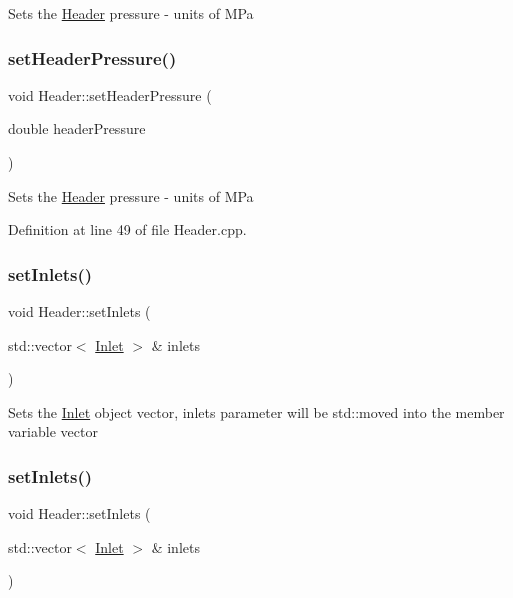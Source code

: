 Sets the \hyperlink{class_header}{Header} pressure -\/ units of M\+Pa \mbox{\label{class_header_a3af0b7964b74287ce0c662b9a88556ed}} 
\subsubsection{\texorpdfstring{set\+Header\+Pressure()}{setHeaderPressure()}\hspace{0.1cm}{\footnotesize\ttfamily [3/3]}}
{\footnotesize\ttfamily void Header\+::set\+Header\+Pressure (\begin{DoxyParamCaption}\item[{double}]{header\+Pressure }\end{DoxyParamCaption})}

Sets the \hyperlink{class_header}{Header} pressure -\/ units of M\+Pa 

Definition at line 49 of file Header.\+cpp.

\mbox{\label{class_header_ae69b6f894210a6cd340e92222f8bc343}} 
\subsubsection{\texorpdfstring{set\+Inlets()}{setInlets()}\hspace{0.1cm}{\footnotesize\ttfamily [1/3]}}
{\footnotesize\ttfamily void Header\+::set\+Inlets (\begin{DoxyParamCaption}\item[{std\+::vector$<$ \hyperlink{class_inlet}{Inlet} $>$ \&}]{inlets }\end{DoxyParamCaption})}

Sets the \hyperlink{class_inlet}{Inlet} object vector, inlets parameter will be std\+::moved into the member variable vector \mbox{\label{class_header_ae69b6f894210a6cd340e92222f8bc343}} 
\subsubsection{\texorpdfstring{set\+Inlets()}{setInlets()}\hspace{0.1cm}{\footnotesize\ttfamily [2/3]}}
{\footnotesize\ttfamily void Header\+::set\+Inlets (\begin{DoxyParamCaption}\item[{std\+::vector$<$ \hyperlink{class_inlet}{Inlet} $>$ \&}]{inlets }\end{DoxyParamCaption})}

